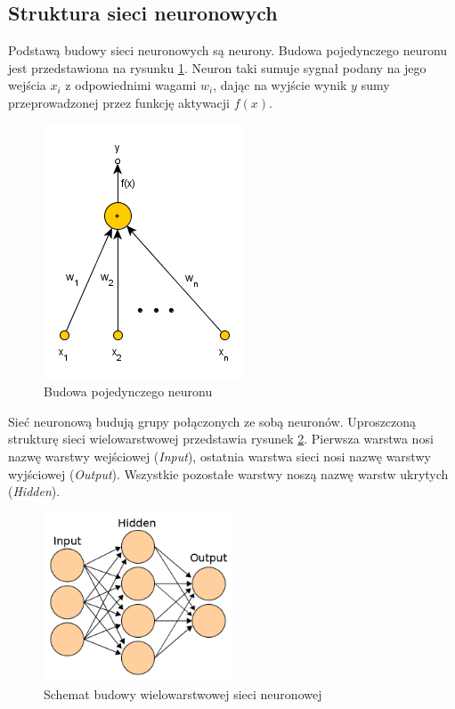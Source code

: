 \subsection{Struktura sieci neuronowych}
Podstawą budowy sieci neuronowych są neurony. Budowa pojedynczego neuronu jest przedstawiona na rysunku \ref{fig:neuron}. Neuron taki sumuje sygnał podany na jego wejścia $x_i$ z odpowiednimi wagami $w_i$, dając na wyjście wynik $y$ sumy przeprowadzonej przez funkcję aktywacji $f(x)$.
\begin{figure}[ht!]
	\centering
	\includegraphics[scale=0.8]{images/single_neuron.png}
	\caption{Budowa pojedynczego neuronu}
	\label{fig:neuron}
\end{figure}

Sieć neuronową budują grupy połączonych ze sobą neuronów. Uproszczoną strukturę sieci wielowarstwowej przedstawia rysunek \ref{fig:multilayer}. Pierwsza warstwa nosi nazwę warstwy wejściowej (\textit{Input}), ostatnia warstwa sieci nosi nazwę warstwy wyjściowej (\textit{Output}). Wszystkie pozostałe warstwy noszą nazwę warstw ukrytych (\textit{Hidden}).

\begin{figure}
	\centering
	\includegraphics[width=0.5\textwidth]{images/560px-Artificial_neural_network.png}
	\caption{Schemat budowy wielowarstwowej sieci neuronowej}
	\label{fig:multilayer}
\end{figure}

